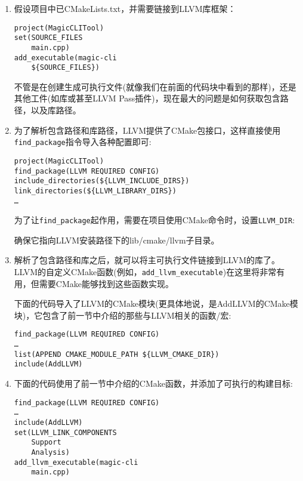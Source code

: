 \begin{enumerate}
\item 假设项目中已CMakeLists.txt，并需要链接到LLVM库框架：

\begin{lstlisting}[style=styleCMake]
project(MagicCLITool)
set(SOURCE_FILES
	main.cpp)
add_executable(magic-cli
	${SOURCE_FILES})
\end{lstlisting}

不管是在创建生成可执行文件(就像我们在前面的代码块中看到的那样)，还是其他工件(如库或甚至LLVM Pass插件)，现在最大的问题是如何获取包含路径，以及库路径。

\item 为了解析包含路径和库路径，LLVM提供了CMake包接口，这样直接使用\texttt{find\_package}指令导入各种配置即可:
	
\begin{lstlisting}[style=styleCMake]
project(MagicCLITool)
find_package(LLVM REQUIRED CONFIG)
include_directories(${LLVM_INCLUDE_DIRS})
link_directories(${LLVM_LIBRARY_DIRS})
…
\end{lstlisting}
	
为了让\texttt{find\_package}起作用，需要在项目使用CMake命令时，设置\texttt{LLVM\_DIR}:


确保它指向LLVM安装路径下的lib/cmake/llvm子目录。
	
\item 解析了包含路径和库之后，就可以将主可执行文件链接到LLVM的库了。LLVM的自定义CMake函数(例如，\texttt{add\_llvm\_executable})在这里将非常有用，但需要CMake能够找到这些函数实现。

下面的代码导入了LLVM的CMake模块(更具体地说，是AddLLVM的CMake模块)，它包含了前一节中介绍的那些与LLVM相关的函数/宏:

\begin{lstlisting}[style=styleCMake]
find_package(LLVM REQUIRED CONFIG)
…
list(APPEND CMAKE_MODULE_PATH ${LLVM_CMAKE_DIR})
include(AddLLVM)
\end{lstlisting}

\item 下面的代码使用了前一节中介绍的CMake函数，并添加了可执行的构建目标:

\begin{lstlisting}[style=styleCMake]
find_package(LLVM REQUIRED CONFIG)
…
include(AddLLVM)
set(LLVM_LINK_COMPONENTS
	Support
	Analysis)
add_llvm_executable(magic-cli
	main.cpp)
\end{lstlisting}


\end{enumerate}
